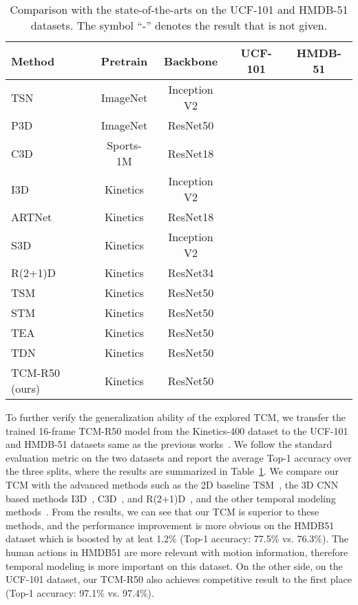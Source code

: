 \documentclass[journal]{IEEEtran}
\begin{document}
\setlength{\tabcolsep}{4.5pt}
\begin{table}
\caption{Comparison with the state-of-the-arts on the UCF-101 and HMDB-51 datasets. The symbol ``-” denotes the result that is not given.}
\label{tab:ucf-hmdb}
\centering
\begin{tabular}{l|c|c|c|c}
\hline
Method & Pretrain & Backbone & UCF-101 & HMDB-51 \\
\hline TSN~\cite{wang2016temporal} & ImageNet & Inception V2 &  &  \\
P3D~\cite{qiu2017learning} & ImageNet & ResNet50 &  &  \\
C3D~\cite{tran2015learning} & Sports-1M & ResNet18 &  &  \\
I3D~\cite{carreira2017quo} & Kinetics & Inception V2 &  &  \\
ARTNet~\cite{wang2018appearance} & Kinetics & ResNet18 &  &  \\
S3D~\cite{xie2018rethinking} & Kinetics & Inception V2 &  &  \\
R(2+1)D~\cite{tran2018closer} & Kinetics & ResNet34 &  &  \\
TSM~\cite{lin2019tsm} & Kinetics & ResNet50 &  &  \\
STM~\cite{jiang2019stm} & Kinetics & ResNet50 &  &  \\
TEA~\cite{li2020tea} & Kinetics & ResNet50 &  &  \\
TDN~\cite{wang2021tdn} & Kinetics & ResNet50 &  &  \\ \hline
TCM-R50 (ours) & Kinetics & ResNet50 &  &  \\
\hline
\end{tabular}
\end{table}

To further verify the generalization ability of the explored TCM, we transfer the trained 16-frame TCM-R50 model from the Kinetics-400 dataset to the UCF-101 and HMDB-51 datasets same as the previous works~\cite{lin2019tsm, li2020tea, wang2021tdn}. We follow the standard evaluation metric on the two datasets and report the average Top-1 accuracy over the three splits, where the results are summarized in Table~\ref{tab:ucf-hmdb}. We compare our TCM with the advanced methods such as the 2D baseline TSM~\cite{lin2019tsm}, the 3D CNN based methods I3D~\cite{carreira2017quo}, C3D~\cite{tran2015learning}, and R(2+1)D~\cite{tran2018closer}, and the other temporal modeling methods~\cite{jiang2019stm,li2020tea,wang2021tdn}. From the results, we can see that our TCM is superior to these methods, and the performance improvement is more obvious on the HMDB51 dataset which is boosted by at leat 1.2\% (Top-1 accuracy: 77.5\% vs. 76.3\%). The human actions in HMDB51 are more relevant with motion information, therefore temporal modeling is more important on this dataset. On the other side, on the UCF-101 dataset, our TCM-R50 also achieves competitive result to the first place (Top-1 accuracy: 97.1\% vs. 97.4\%).
\end{document}
